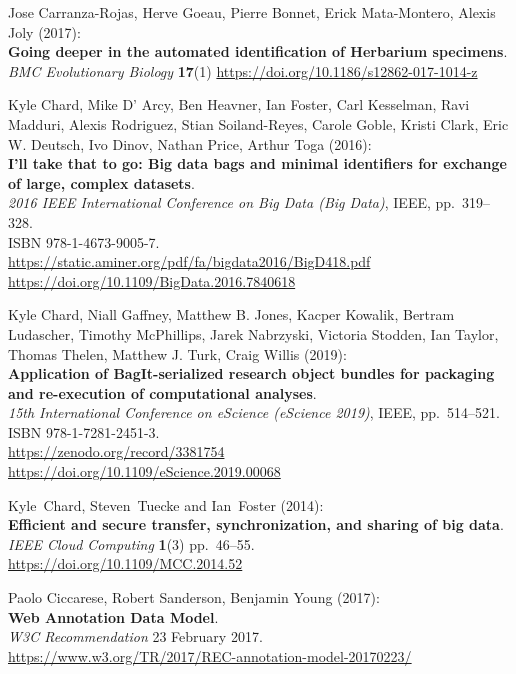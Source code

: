 \begin{thebibliography}{9}
Jose Carranza-Rojas, Herve Goeau, Pierre Bonnet, Erick Mata-Montero, Alexis Joly (2017):\\
\textbf{Going deeper in the automated identification of Herbarium specimens}.\\
\emph{BMC Evolutionary Biology} \textbf{17}(1)
\url{https://doi.org/10.1186/s12862-017-1014-z}

Kyle Chard, Mike D' Arcy, Ben Heavner, Ian Foster, Carl
Kesselman, Ravi Madduri, Alexis Rodriguez, Stian Soiland-Reyes, Carole
Goble, Kristi Clark, Eric W. Deutsch, Ivo Dinov, Nathan Price, Arthur
Toga (2016):\\
\textbf{I'll take that to go: Big data bags and minimal identifiers for
exchange of large, complex datasets}.\\
\emph{2016 IEEE International Conference on Big Data (Big Data)}, IEEE,
pp.~319--328.\\
ISBN 978-1-4673-9005-7.\\
\url{https://static.aminer.org/pdf/fa/bigdata2016/BigD418.pdf}\\
\url{https://doi.org/10.1109/BigData.2016.7840618}

Kyle Chard, Niall Gaffney, Matthew B. Jones, Kacper Kowalik,
Bertram Ludascher, Timothy McPhillips, Jarek Nabrzyski, Victoria
Stodden, Ian Taylor, Thomas Thelen, Matthew J. Turk, Craig Willis
(2019):\\
\textbf{Application of BagIt-serialized research object bundles for
packaging and re-execution of computational analyses}.\\
\emph{15th International Conference on eScience (eScience 2019)}, IEEE,
pp.~514--521.\\
ISBN 978-1-7281-2451-3.\\
\url{https://zenodo.org/record/3381754}\\
\url{https://doi.org/10.1109/eScience.2019.00068}

Kyle~Chard, Steven~Tuecke and Ian~Foster (2014):\\
\textbf{Efficient and secure transfer, synchronization, and sharing of
big data}.\\
\emph{IEEE Cloud Computing} \textbf{1}(3) pp.~46--55.\\
\url{https://doi.org/10.1109/MCC.2014.52}

Paolo Ciccarese, Robert Sanderson, Benjamin Young (2017):\\
\textbf{Web Annotation Data Model}.\\
\emph{W3C Recommendation} 23 February 2017.\\
\url{https://www.w3.org/TR/2017/REC-annotation-model-20170223/}


\end{thebibliography}
